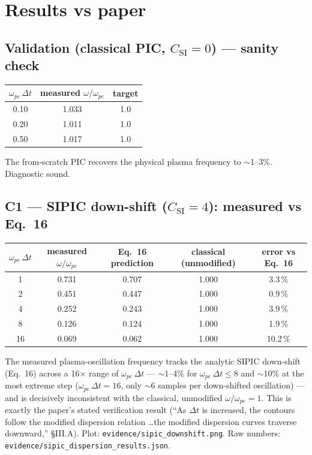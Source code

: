 \documentclass[11pt]{article}
\begin{document}
\section{Results vs paper}

\subsection*{Validation (classical PIC, $C_{\text{SI}}=0$) --- sanity check}
\begin{center}
\begin{tabular}{@{}ccc@{}}
\toprule
$\omega_{pe}\,\Delta t$ & measured $\omega/\omega_{pe}$ & target \\
\midrule
0.10 & 1.033 & 1.0 \\
0.20 & 1.011 & 1.0 \\
0.50 & 1.017 & 1.0 \\
\bottomrule
\end{tabular}
\end{center}
The from-scratch PIC recovers the physical plasma frequency to
$\sim$1--3\%. Diagnostic sound.

\subsection*{C1 --- SIPIC down-shift ($C_{\text{SI}}=4$): measured vs Eq.~16}
\begin{center}
\begin{tabular}{@{}ccccc@{}}
\toprule
$\omega_{pe}\,\Delta t$ & measured $\omega/\omega_{pe}$ & Eq.~16 prediction & classical (unmodified) & error vs Eq.~16 \\
\midrule
1  & 0.731 & 0.707 & 1.000 & 3.3\,\% \\
2  & 0.451 & 0.447 & 1.000 & 0.9\,\% \\
4  & 0.252 & 0.243 & 1.000 & 3.9\,\% \\
8  & 0.126 & 0.124 & 1.000 & 1.9\,\% \\
16 & 0.069 & 0.062 & 1.000 & 10.2\,\% \\
\bottomrule
\end{tabular}
\end{center}

The measured plasma-oscillation frequency tracks the analytic SIPIC
down-shift (Eq.~16) across a 16$\times$ range of $\omega_{pe}\,\Delta t$
--- $\sim$1--4\% for $\omega_{pe}\,\Delta t\le 8$ and $\sim$10\% at the
most extreme step ($\omega_{pe}\,\Delta t = 16$, only $\sim$6 samples
per down-shifted oscillation) --- and is decisively inconsistent with
the classical, unmodified $\omega/\omega_{pe}=1$. This is exactly the
paper's stated verification result (``As $\Delta t$ is increased, the
contours follow the modified dispersion relation \ldots the modified
dispersion curves traverse downward,'' \S III.A). Plot:
\texttt{evidence/sipic\_downshift.png}. Raw numbers:
\texttt{evidence/sipic\_dispersion\_results.json}.
\end{document}
